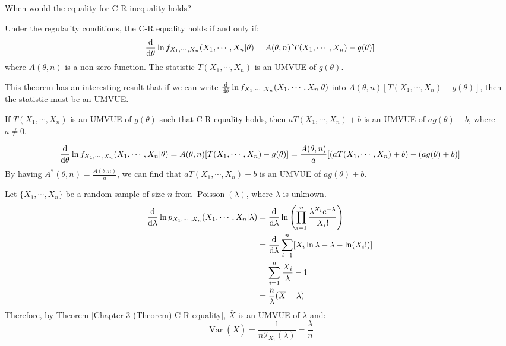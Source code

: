 \documentclass{huhtakm-template-book-v2}
\DeclareMathOperator{\Var}{Var}
\DeclareMathOperator{\Poisson}{Poisson}
\begin{document}
\newpage
When would the equality for C-R inequality holds?
\begin{thm}
	\label{Chapter 3 (Theorem) C-R equality}
	Under the regularity conditions, the C-R equality holds if and only if:
	\begin{equation*}
		\odv*{\ln{f_{X_{1},\cdots,X_{n}}(X_{1},\cdots,X_{n}|\theta)}}{\theta}=A(\theta,n)[T(X_{1},\cdots,X_{n})-g(\theta)]
	\end{equation*}
	where $A(\theta,n)$ is a non-zero function. The statistic $T(X_{1},\cdots,X_{n})$ is an UMVUE of $g(\theta)$. 
\end{thm}
This theorem has an interesting result that if we can write $\odv*{\ln{f_{X_{1},\cdots,X_{n}}(X_{1},\cdots,X_{n}|\theta)}}{\theta}$ into $A(\theta,n)[T(X_{1},\cdots,X_{n})-g(\theta)]$, then the statistic must be an UMVUE.
\begin{lem}
	If $T(X_{1},\cdots,X_{n})$ is an UMVUE of $g(\theta)$ such that C-R equality holds, then $aT(X_{1},\cdots,X_{n})+b$ is an UMVUE of $ag(\theta)+b$, where $a\neq 0$.
\end{lem}
\begin{proofing}
	\begin{equation*}
		\odv*{\ln{f_{X_{1},\cdots,X_{n}}(X_{1},\cdots,X_{n}|\theta)}}{\theta}=A(\theta,n)[T(X_{1},\cdots,X_{n})-g(\theta)]=\frac{A(\theta,n)}{a}[(aT(X_{1},\cdots,X_{n})+b)-(ag(\theta)+b)]
	\end{equation*}
	By having $A^{*}(\theta,n)=\frac{A(\theta,n)}{a}$, we can find that $aT(X_{1},\cdots,X_{n})+b$ is an UMVUE of $ag(\theta)+b$.
\end{proofing}
\begin{eg}
	Let $\{X_{1},\cdots,X_{n}\}$ be a random sample of size $n$ from $\Poisson(\lambda)$, where $\lambda$ is unknown.
	\begin{align*}
		\odv*{\ln{p_{X_{1},\cdots,X_{n}}(X_{1},\cdots,X_{n}|\lambda)}}{\lambda}&=\odv*{\ln\left(\prod_{i=1}^{n}\frac{\lambda^{X_{i}}e^{-\lambda}}{X_{i}!}\right)}{\lambda}\\
		&=\odv*{\sum_{i=1}^{n}[X_{i}\ln{\lambda}-\lambda-\ln(X_{i}!)]}{\lambda}\\
		&=\sum_{i=1}^{n}\frac{X_{i}}{\lambda}-1\\
		&=\frac{n}{\lambda}(\overline{X}-\lambda)
	\end{align*}
	Therefore, by Theorem \ref{Chapter 3 (Theorem) C-R equality}, $\overline{X}$ is an UMVUE of $\lambda$ and:
	\begin{equation*}
		\Var(\overline{X})=\frac{1}{n\mathcal{I}_{X_{1}}(\lambda)}=\frac{\lambda}{n}
	\end{equation*}
\end{eg}
\end{document}
